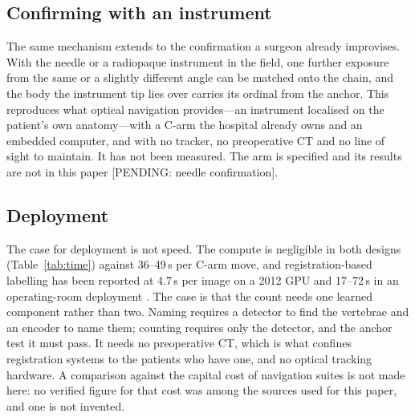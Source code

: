 \documentclass[11pt,letterpaper]{article}
\begin{document}
\subsection*{Confirming with an instrument}
The same mechanism extends to the confirmation a surgeon already improvises. With the needle or a
radiopaque instrument in the field, one further exposure from the same or a slightly different angle can be
matched onto the chain, and the body the instrument tip lies over carries its ordinal from the anchor. This
reproduces what optical navigation provides---an instrument localised on the patient's own anatomy---with a
C-arm the hospital already owns and an embedded computer, and with no tracker, no preoperative CT and no
line of sight to maintain. It has not been measured. The arm is specified and its results are not in this
paper [PENDING: needle confirmation].

\subsection*{Deployment}
The case for deployment is not speed. The compute is negligible in both designs (Table~\ref{tab:time})
against 36--49\,s per C-arm move, and registration-based labelling has been reported at 4.7\,s per image on
a 2012 GPU and 17--72\,s in an operating-room deployment \citep{levelcheck2012,manbachi2018}. The case is
that the count needs one learned component rather than two. Naming requires a detector to find the
vertebrae and an encoder to name them; counting requires only the detector, and the anchor test it must
pass. It needs no preoperative CT, which is what confines registration systems to the patients who have
one, and no optical tracking hardware. A comparison against the capital cost of navigation suites is not
made here: no verified figure for that cost was among the sources used for this paper, and one is not
invented.
\end{document}
